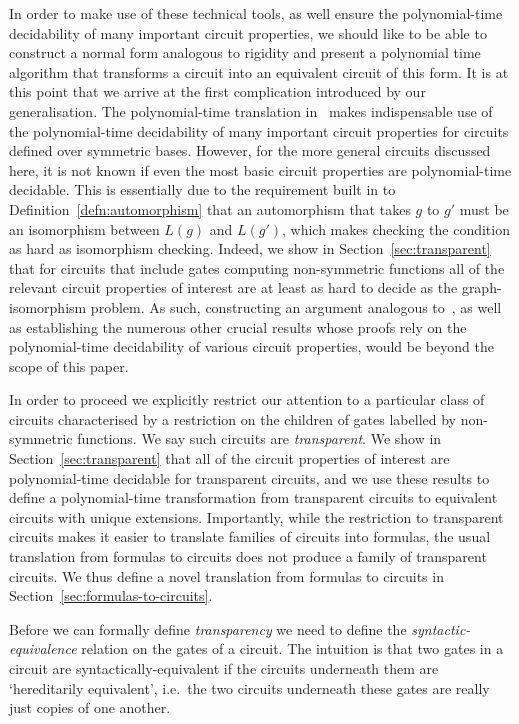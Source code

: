\documentclass[../main/thesis.tex]{subfiles}
\begin{document}
In order to make use of these technical tools, as well ensure the
polynomial-time decidability of many important circuit properties, we should
like to be able to construct a normal form analogous to rigidity and present a
polynomial time algorithm that transforms a circuit into an equivalent circuit
of this form. It is at this point that we arrive at the first complication
introduced by our generalisation. The polynomial-time translation
in~\cite{AndersonD17} makes indispensable use of the polynomial-time
decidability of many important circuit properties for circuits defined over
symmetric bases. However, for the more general circuits discussed here, it is
not known if even the most basic circuit properties are polynomial-time
decidable. This is essentially due to the requirement built in to
Definition~\ref{defn:automorphism} that an automorphism that takes $g$ to $g'$
must be an isomorphism between $L(g)$ and $L(g')$, which makes checking the
condition as hard as isomorphism checking. Indeed, we show in
Section~\ref{sec:transparent} that for circuits that include gates computing
non-symmetric functions all of the relevant circuit properties of interest are
at least as hard to decide as the graph-isomorphism problem. As such,
constructing an argument analogous to~\cite{AndersonD17}, as well as
establishing the numerous other crucial results whose proofs rely on the
polynomial-time decidability of various circuit properties, would be beyond the
scope of this paper.

In order to proceed we explicitly restrict our attention to a particular class
of circuits characterised by a restriction on the children of gates labelled by
non-symmetric functions. We say such circuits are \emph{transparent}. We show in
Section~\ref{sec:transparent} that all of the circuit properties of interest are
polynomial-time decidable for transparent circuits, and we use these results to
define a polynomial-time transformation from transparent circuits to equivalent
circuits with unique extensions. Importantly, while the restriction to
transparent circuits makes it easier to translate families of circuits into
formulas, the usual translation from formulas to circuits does not produce a
family of transparent circuits. We thus define a novel translation from formulas
to circuits in Section~\ref{sec:formulas-to-circuits}.

Before we can formally define \emph{transparency} we need to define the
\emph{syntactic-equivalence} relation on the gates of a circuit. The intuition
is that two gates in a circuit are syntactically-equivalent if the circuits
underneath them are `hereditarily equivalent', i.e.\ the two circuits underneath
these gates are really just copies of one another.
\end{document}
